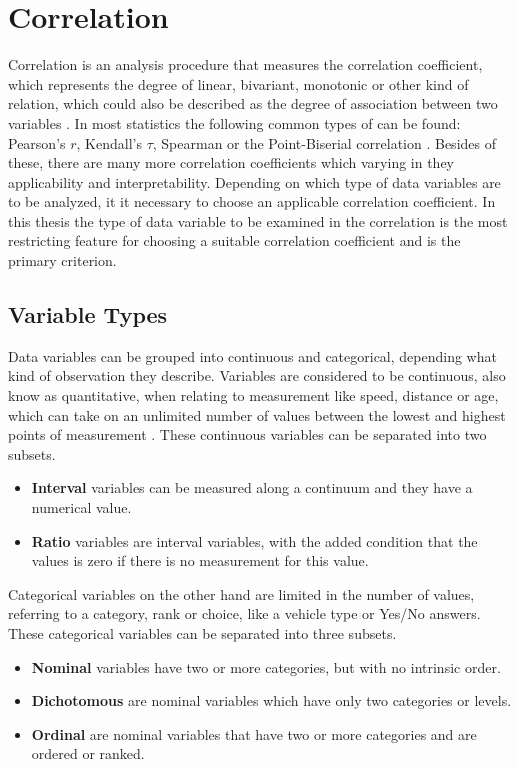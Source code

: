 \documentclass[a4paper,12pt]{report}
\begin{document}
\section{Correlation}
\label{definition_correlation}
Correlation is an analysis procedure that measures the correlation coefficient, which represents the degree of linear, bivariant, monotonic or other kind of relation, which could also be described as the degree of association between two variables \cite{HerzSchlicherSiegener1992}. In most statistics the following common types of can be found: Pearson's $r$, Kendall's $\tau$, Spearman or the Point-Biserial correlation \cite{Ramzai2020,SPSS2020a,SPSS2020b}. Besides of these, there are many more correlation coefficients which varying in they applicability and interpretability. Depending on which type of data variables are to be analyzed, it it necessary to choose an applicable correlation coefficient. In this thesis the type of data variable to be examined in the correlation is the most restricting feature for choosing a suitable correlation coefficient and is the primary criterion.

\subsection{Variable Types}
Data variables can be grouped into continuous and categorical, depending what kind of observation they describe. Variables are considered to be continuous, also know as quantitative, when relating to measurement like speed, distance or age, which can take on an unlimited number of values between the lowest and highest points of measurement \cite{McCue2007}. These continuous variables can be separated into two subsets. 

\begin{itemize}
	\item \textbf{Interval} variables can be measured along a continuum and they have a numerical value. \cite{Laerd2020}
    \item \textbf{Ratio} variables are interval variables, with the added condition that the values is zero if there is no measurement for this value. \cite{Laerd2020}
\end{itemize}

Categorical variables on the other hand are limited in the number of values, referring to a category, rank or choice, like a vehicle type or Yes/No answers. These categorical variables can be separated into three subsets.

\begin{itemize}
	\item \textbf{Nominal} variables have two or more categories, but with no intrinsic order. \cite{Laerd2020}
	\item \textbf{Dichotomous} are nominal variables which have only two categories or levels. \cite{Laerd2020}
    \item \textbf{Ordinal} are nominal variables that have two or more categories and are ordered or ranked. \cite{Laerd2020}
\end{itemize}
\end{document}
